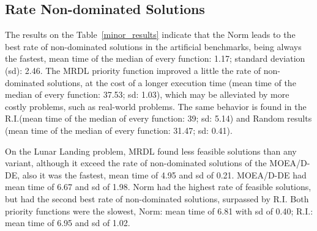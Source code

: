 \subsection{Rate Non-dominated Solutions}

The results on the Table~\ref{minor_results} indicate that the Norm leads to the best rate of non-dominated solutions in the artificial benchmarks, being always the fastest, mean time of the median of every function: 1.17; standard deviation (sd): 2.46. The MRDL priority function improved a little the rate of non-dominated solutions, at the cost of a longer execution time (mean time of the median of every function: 37.53; sd: 1.03), which may be alleviated by more costly problems, such as real-world problems.  The same behavior is found in the R.I.(mean time of the median of every function: 39; sd: 5.14) and Random results (mean time of the median of every function: 31.47; sd: 0.41). 

On the Lunar Landing problem, MRDL found less feasible solutions than any variant, although it exceed the rate of non-dominated solutions of the MOEA/D-DE, also it was the fastest, mean time of 4.95 and sd of 0.21. MOEA/D-DE had mean time of 6.67 and sd of 1.98. Norm had the highest rate of feasible solutions, but had the second best rate of non-dominated solutions, surpassed by R.I. Both priority functions were the slowest, Norm: mean time of 6.81 with sd of 0.40; R.I.: mean time of 6.95 and sd of 1.02. 











